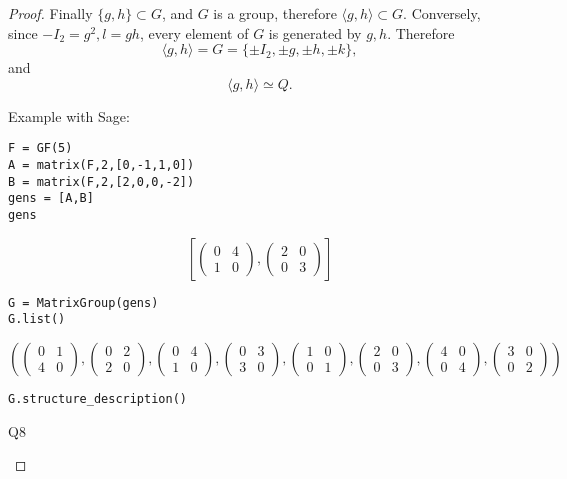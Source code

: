 \documentclass[11pt,a4paper]{article}
\begin{document}
{\begin{proof}
Finally $\{g , h\}  \subset G$, and $G$ is a group, therefore $\langle g,h \rangle \subset G$. Conversely, since $-I_2 =g^2, l = gh$, every element of $G$ is generated by $g,h$. Therefore
$$\langle g,h \rangle = G = \{\pm I_2,\pm g, \pm h, \pm k\},$$
and 
$$\langle g,h \rangle \simeq Q.$$

Example with Sage:
\begin{verbatim}
F = GF(5)
A = matrix(F,2,[0,-1,1,0])
B = matrix(F,2,[2,0,0,-2])
gens = [A,B]
gens
\end{verbatim}
$$
\left[\left(\begin{array}{rr}
0 & 4 \\
1 & 0
\end{array}\right), \left(\begin{array}{rr}
2 & 0 \\
0 & 3
\end{array}\right)\right]
$$
\begin{verbatim}
G = MatrixGroup(gens)
G.list()
\end{verbatim}
$$
\left(\left(\begin{array}{rr}
0 & 1 \\
4 & 0
\end{array}\right), \left(\begin{array}{rr}
0 & 2 \\
2 & 0
\end{array}\right), \left(\begin{array}{rr}
0 & 4 \\
1 & 0
\end{array}\right), \left(\begin{array}{rr}
0 & 3 \\
3 & 0
\end{array}\right), \left(\begin{array}{rr}
1 & 0 \\
0 & 1
\end{array}\right), \left(\begin{array}{rr}
2 & 0 \\
0 & 3
\end{array}\right), \left(\begin{array}{rr}
4 & 0 \\
0 & 4
\end{array}\right), \left(\begin{array}{rr}
3 & 0 \\
0 & 2
\end{array}\right)\right)
$$
\begin{verbatim}
G.structure_description()
\end{verbatim}
\begin{center}
Q8
\end{center}


\end{proof}}
\end{document}
